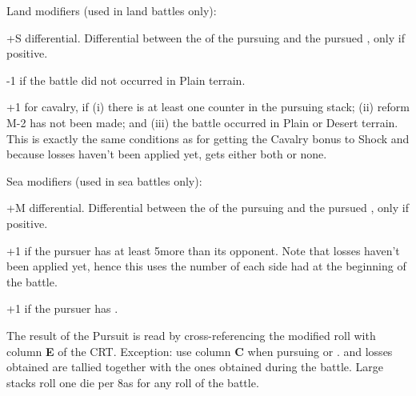 Land modifiers (used in land battles only):
\begin{modlist}
\item[+S] \Shock differential. Differential between the \Shock of the pursuing
  \LeaderG and the pursued \LeaderG, only if positive.
\item[-1] if the battle did not occurred in Plain terrain.
\item[+1] for \TUR {} cavalry, if (i) there is at least one \TUR
  \ARMY counter in the pursuing stack; (ii) reform M-2 has not been made; and
  (iii) the battle occurred in Plain or Desert terrain. This is exactly the
  same conditions as for getting the Cavalry bonus to Shock and because losses
  haven't been applied yet, \TUR gets either both or none.
\end{modlist}

Sea modifiers (used in sea battles only):
\begin{modlist}
\item[+M] \Man differential. Differential between the \Man of the pursuing
  \LeaderA and the pursued \LeaderA, only if positive.
\item[+1] if the pursuer has at least 5\ND more than its opponent. Note that
  losses haven't been applied yet, hence this uses the number of \ND each side
  had at the beginning of the battle.
\item[+1] if the pursuer has .
\end{modlist}

The result of the Pursuit is read by cross-referencing the modified roll with
column \textbf{E} of the CRT. Exception: use column \textbf{C} when pursuing
\NTD or \NGD. \textetoile and losses obtained are tallied together with the
ones obtained during the battle. Large  stacks roll one die per
8\LD as for any roll of the battle.

